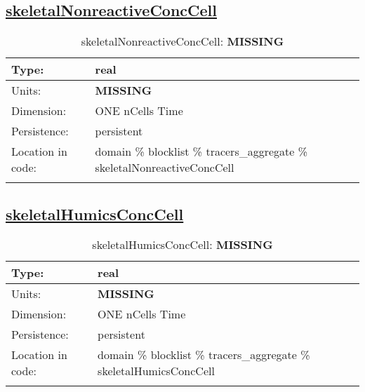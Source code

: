 \subsection[skeletalNonreactiveConcCell]{\hyperref[sec:var_tab_tracers_aggregate]{skeletalNonreactiveConcCell}}
\label{subsec:var_sec_tracers_aggregate_skeletalNonreactiveConcCell}
\begin{center}
\begin{longtable}{| p{2.0in} | p{4.0in} |}
        \hline 
        Type: & real \\
        \hline 
        Units: & {\bf \color{red} MISSING} \\
        \hline 
        Dimension: & ONE nCells Time \\
        \hline 
        Persistence: & persistent \\
        \hline 
         Location in code: & domain \% blocklist \% tracers\_aggregate \% skeletalNonreactiveConcCell \\
         \hline 
    \caption{skeletalNonreactiveConcCell: {\bf \color{red} MISSING}}
\end{longtable}
\end{center}
\subsection[skeletalHumicsConcCell]{\hyperref[sec:var_tab_tracers_aggregate]{skeletalHumicsConcCell}}
\label{subsec:var_sec_tracers_aggregate_skeletalHumicsConcCell}
\begin{center}
\begin{longtable}{| p{2.0in} | p{4.0in} |}
        \hline 
        Type: & real \\
        \hline 
        Units: & {\bf \color{red} MISSING} \\
        \hline 
        Dimension: & ONE nCells Time \\
        \hline 
        Persistence: & persistent \\
        \hline 
         Location in code: & domain \% blocklist \% tracers\_aggregate \% skeletalHumicsConcCell \\
         \hline 
    \caption{skeletalHumicsConcCell: {\bf \color{red} MISSING}}
\end{longtable}
\end{center}
